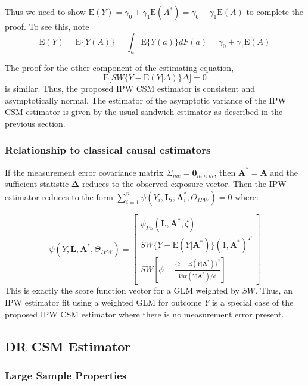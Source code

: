 \documentclass[12pt]{article}
\begin{document}
Thus we need to show $\text{E}(Y) = \gamma_0 + \gamma_1 \text{E}(A^*) = \gamma_0 + \gamma_1 \text{E}(A)$ to complete the proof. To see this, note
\[
\text{E}(Y) = \text{E} \{ Y(A) \} = \int_a \text{E}\{ Y(a) \} dF(a) = \gamma_0 + \gamma_1 \text{E}(A)
\]

The proof for the other component of the estimating equation,
\[
\text{E} \bigg[SW \{ Y - \text{E}(Y | \Delta)\} \Delta \bigg] = 0
\]
is similar. Thus, the proposed IPW CSM estimator is consistent and asymptotically normal. The estimator of the asymptotic variance of the IPW CSM estimator is given by the usual sandwich estimator as described in the previous section.

\subsubsection{Relationship to classical causal estimators}

If the measurement error covariance matrix $\Sigma_{me} = \textbf{0}_{m \times m}$, then $\bm{A}^{*} = \bm{A}$ and the sufficient statistic $\bm{\Delta}$ reduces to the observed exposure vector. Then the IPW estimator reduces to the form $\sum_{i=1}^{n} \psi(Y_{i}, \bm{L}_{i}, \bm{A}^{*}_{i}, \Theta_{IPW}) = 0$ where:

\begin{equation*}
    \psi(Y, \bm{L}, \bm{A}^{*}, \Theta_{IPW}) =
    \begin{bmatrix}
      \psi_{PS}(\bm{L}, \bm{A}^{*}, \zeta) \\
       SW\{ Y - \text{E}(Y | \bm{A}^{*}) \} (1, \bm{A}^{*})^{T} \\
       SW \left [ \phi - \frac{ \{Y - \text{E}(Y | \bm{A}^{*}) \}^{2}}{Var(Y | \bm{A}^{*}) / \phi} \right ]
    \end{bmatrix}
\end{equation*}
This is exactly the score function vector for a GLM weighted by $SW$. Thus, an IPW estimator fit using a weighted GLM for outcome $Y$ is a special case of the proposed IPW CSM estimator where there is no measurement error present.

\subsection{DR CSM Estimator}

\subsubsection{Large Sample Properties}
\end{document}
